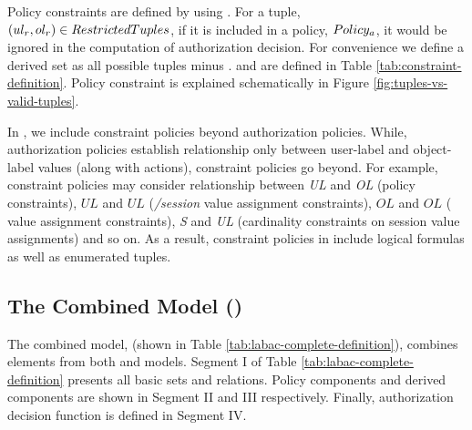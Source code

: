 	


	Policy constraints are defined by using \textit{\restrictedTuples}.  For a tuple, $(ul_r,ol_r) \in RestrictedTuples$, if it is included in a policy, $Policy_a$, it would be ignored in the computation of authorization decision. For convenience we define a derived set \textit{\policyBound} as all possible tuples minus \textit{\restrictedTuples}. \textit{\restrictedTuples} and \textit{\policyBound} are defined in Table \ref{tab:constraint-definition}. Policy constraint is explained schematically in Figure \ref{fig:tuples-vs-valid-tuples}.
	
	In \consLabac{}, we include constraint policies beyond authorization policies. While, authorization policies establish relationship only between user-label and object-label values (along with actions), constraint policies go beyond. For example, constraint policies may consider relationship between \textit{UL} and \textit{OL} (policy constraints), $UL$ and $UL$ (\textit{\uLabel/session} value assignment constraints), $OL$ and $OL$ (\textit{\oLabel} value assignment constraints), \textit{S} and \textit{UL} (cardinality constraints on session value assignments) and so on.  As a result, constraint policies in \consLabac{} include logical formulas as well as enumerated tuples.
	
	
	
	
	\subsection{The Combined Model (\labacOneOneOne{})}
	
	The combined model, \labacOneOneOne{} (shown in Table \ref{tab:labac-complete-definition}), combines elements from both \hlabac{} and \consLabac{} models.  Segment I of Table \ref{tab:labac-complete-definition} presents all basic sets and relations. Policy components and derived components are shown in Segment II and  III respectively. Finally, authorization decision function is defined in Segment IV.
	

